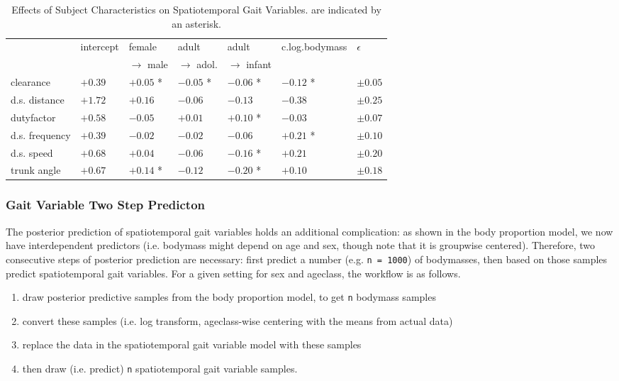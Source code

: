 \begin{table}[p]
\caption{\label{tab:strideresults}Effects of Subject Characteristics on Spatiotemporal Gait Variables.  are indicated by an asterisk.}
\centering
\begin{small}
\begin{tabular}{|l|l|l|l|l|l|l|}
\hline
 & intercept & female  & adult  & adult  & c.log.bodymass & \(\epsilon\)\\[0pt]
 &  & \(\rightarrow\) male & \(\rightarrow\) adol. & \(\rightarrow\) infant &  & \\[0pt]
\hline
clearance & \(+0.39\) & \(+0.05\) * & \(-0.05\) * & \(-0.06\) * & \(-0.12\) * & \(\pm 0.05\)\\[0pt]
d.s. distance & \(+1.72\) & \(+0.16\) & \(-0.06\) & \(-0.13\) & \(-0.38\) & \(\pm 0.25\)\\[0pt]
dutyfactor & \(+0.58\) & \(-0.05\) & \(+0.01\) & \(+0.10\) * & \(-0.03\) & \(\pm 0.07\)\\[0pt]
d.s. frequency & \(+0.39\) & \(-0.02\) & \(-0.02\) & \(-0.06\) & \(+0.21\) * & \(\pm 0.10\)\\[0pt]
d.s. speed & \(+0.68\) & \(+0.04\) & \(-0.06\) & \(-0.16\) * & \(+0.21\) & \(\pm 0.20\)\\[0pt]
trunk angle & \(+0.67\) & \(+0.14\) * & \(-0.12\) & \(-0.20\) * & \(+0.10\) & \(\pm 0.18\)\\[0pt]
\hline
\end{tabular}
\end{small}
\end{table}


\subsubsection{Gait Variable Two Step Predicton}
\label{sec:org3879560}
The posterior prediction of spatiotemporal gait variables holds an additional complication: as shown in the body proportion model, we now have interdependent predictors (i.e. bodymass might depend on age and sex, though note that it is groupwise centered).
Therefore, two consecutive steps of posterior prediction are necessary: first predict a number (e.g. \texttt{n = 1000}) of bodymasses, then based on those samples predict spatiotemporal gait variables.
For a given setting for sex and ageclass, the workflow is as follows.
\begin{enumerate}
\item draw posterior predictive samples from the body proportion model, to get \texttt{n} bodymass samples
\item convert these samples (i.e. log transform, ageclass-wise centering with the means from actual data)
\item replace the data in the spatiotemporal gait variable model with these samples
\item then draw (i.e. predict) \texttt{n} spatiotemporal gait variable samples.
\end{enumerate}

